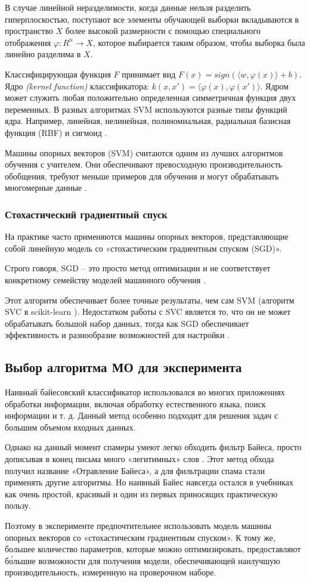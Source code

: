 В случае линейной неразделимости, когда данные нельзя разделить гиперплоскостью, поступают 
все элементы обучающей выборки вкладываются в пространство $X$ более высокой размерности с 
помощью специального отображения $\varphi : R^n \rightarrow X$, которое выбирается таким образом, 
чтобы выборка была линейно разделима в $X$.

Классифицирующая функция $F$ принимает вид $F(x)=sign(\langle w, \varphi (x) \rangle + b)$. 
Ядро \emph{(kernel function)} классификатора: $k(x, x') = \langle \varphi (x), \varphi (x') \rangle $.
Ядром может служить любая положительно определенная симметричная функция двух переменных. 
В разных алгоритмах SVM используются разные типы функций ядра. Например, линейная, нелинейная, 
полиномиальная, радиальная базисная функция (RBF) и сигмоид \cite{SVM}.

Машины опорных векторов (SVM) считаются одним из лучших алгоритмов обучения 
с учителем. Они обеспечивают превосходную производительность обобщения, требуют 
меньше примеров для обучения и могут обрабатывать многомерные данные \cite{scikitSGD}.

\subsubsection{Стохастический градиентный спуск}
На практике часто применяются машины опорных векторов, представляющие собой 
линейную модель со «стохастическим градиентным спуском (SGD)».

Строго говоря, SGD -- это просто метод оптимизации и не соответствует 
конкретному семейству моделей машинного обучения \cite{IEEE}.

Этот алгоритм обеспечивает более точные результаты, чем сам SVM (алгоритм SVC в scikit-learn \cite{SVC}). 
Недостатком работы с SVC является то, что он не может обрабатывать большой 
набор данных, тогда как SGD обеспечивает эффективность и разнообразие 
возможностей для настройки \cite{scikitSGD}.

\subsection{Выбор алгоритма МО для эксперимента}
Наивный байесовский классификатор использовался во многих приложениях обработки 
информации, включая обработку естественного языка, поиск информации и т. д. 
Данный метод особенно подходит для решения задач с большим объемом входных данных.

Однако на данный момент спамеры умеют легко обходить фильтр Байеса, просто дописывая в 
конец письма много «легитимных» слов \cite{filters}. Этот метод обхода получил название «Отравление Байеса», 
а для фильтрации спама стали применять другие алгоритмы. Но наивный Байес навсегда остался 
в учебниках как очень простой, красивый и один из первых приносящих практическую пользу.

Поэтому в эксперименте предпочтительнее использовать модель машины опорных векторов 
со «стохастическим градиентным спуском». К тому же, большее количество параметров, 
которые можно оптимизировать, предоставляют бо́льшие возможности для получения модели, 
обеспечивающей наилучшую производительность, измеренную на проверочном наборе. 

